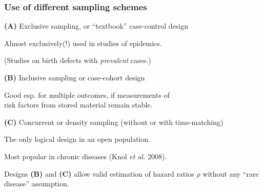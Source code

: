 \documentclass[12pt,dvipsnames,t,handout%
,aspectratio=169%
]{beamer}
\begin{document}
\begin{frame}
\frametitle{\large Use of different sampling schemes}

\pause
\bigskip
 
{\textbf{(A)} Exclusive sampling, or ``textbook'' case-control design}
\bi
\item Almost exclusively(!) used in studies of epidemics. 
\item (Studies on birth defects with \textit{prevalent} cases.)
\ei

\pause
\textbf{(B)} Inclusive sampling or case-cohort design 
\bi
\item Good esp. for multiple outcomes, if
 measurements of  \\ risk factors from stored material
 remain stable.
\ei

\pause
\textbf{(C)} Concurrent or density sampling  
(without or with time-matching) 
 \pause
\bi
\item The only logical design in an open population.
\medskip
\pause
\item Most popular in chronic diseases (Knol {\it et al.} 2008).
\ei

\pause
Designs {\bf (B)} and {\bf (C)} allow valid 
estimation of hazard ratios $\rho$ without any
	``rare disease'' assumption.
	
\end{frame} 
\end{document}
